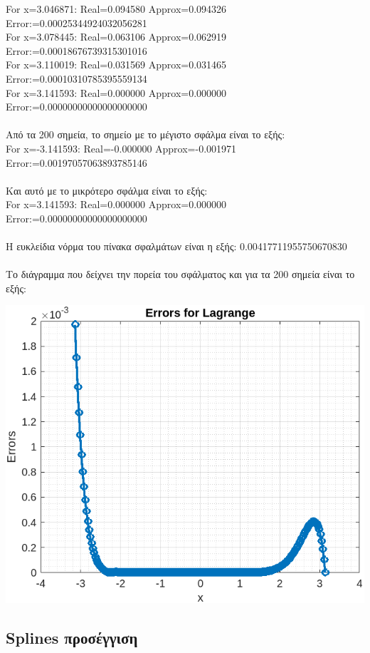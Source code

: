 \documentclass[a4paper, 14pt]{article}   %
\begin{document}
For x=3.046871: Real=0.094580 Approx=0.094326 Error:=0.00025344924032056281\\
For x=3.078445: Real=0.063106 Approx=0.062919 Error:=0.00018676739315301016\\
For x=3.110019: Real=0.031569 Approx=0.031465 Error:=0.00010310785395559134\\
For x=3.141593: Real=0.000000 Approx=0.000000 Error:=0.00000000000000000000\\\\
Από τα 200 σημεία, το σημείο με το μέγιστο σφάλμα είναι το εξής:\\
For x=-3.141593: Real=-0.000000 Approx=-0.001971 Error:=0.00197057063893785146\\\\
Και αυτό με το μικρότερο σφάλμα είναι το εξής:\\
For x=3.141593: Real=0.000000 Approx=0.000000 Error:=0.00000000000000000000\\\\
Η ευκλείδια νόρμα του πίνακα σφαλμάτων είναι η εξής: 0.00417711955750670830\\\\
Το διάγραμμα που δείχνει την πορεία του σφάλματος και για τα 200 σημεία είναι το εξής:

\begin{center}   %
	\includegraphics[scale=0.75]{lagrangeErrors.png}
\end{center}   %

\subsection*{Splines προσέγγιση}   %
\end{document}
